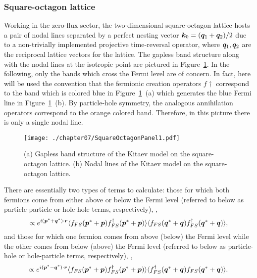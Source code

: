 %
%
\subsubsection{Square-octagon lattice}
\label{section:chapter07_BondBondSquareOctagon}
%
%
Working in the zero-flux sector, the two-dimensional square-octagon lattice hosts a pair of nodal lines separated by a perfect nesting vector $\bm{k}_0 = (\bm{q}_1 + \bm{q}_2)/2$ due to a non-trivially implemented projective time-reversal operator, where $\bm{q}_1, \bm{q}_2$ are the reciprocal lattice vectors for the lattice.
The gapless band structure along with the nodal lines at the isotropic point are pictured in Figure~\ref{fig:chapter07_SquareOctagonPanel1}.
In the following, only the bands which cross the Fermi level are of concern.
In fact, here will be used the convention that the fermionic creation operators $f\dag$ correspond to the band which is colored blue in Figure~\ref{fig:chapter07_SquareOctagonPanel1}~(a) which generates the blue Fermi line in Figure~\ref{fig:chapter07_SquareOctagonPanel1}~(b).
By particle-hole symmetry, the analogous annihilation operators correspond to the orange colored band.
Therefore, in this picture there is only a single nodal line.
%
\begin{figure}[tb]
	\centering
	\texttt{[image: ./chapter07/SquareOctagonPanel1.pdf]}
	\caption{
		(a) Gapless band structure of the Kitaev model on the square-octagon lattice.
		(b) Nodal lines of the Kitaev model on the square-octagon lattice.
	}
	\label{fig:chapter07_SquareOctagonPanel1}
\end{figure}
%

There are essentially two types of terms to calculate: those for which both fermions come from either above or below the Fermi level (referred to below as particle-particle or hole-hole terms, respectively), \ie,
%
\begin{equation}
	\propto e^{i (\bm{p}^* + \bm{q}^*) \cdot \bm{r}} \langle f_{FS}(\bm{p}^* + \bm{p}) f^{\dagger}_{FS}(\bm{p}^* + \bm{p}) \rangle \langle f_{FS}(\bm{q}^* + \bm{q}) f^{\dagger}_{FS}(\bm{q}^* + \bm{q}) \rangle,
\end{equation}
%
and those for which one fermion comes from above (below) the Fermi level while the other comes from below (above) the Fermi level (referred to below as particle-hole or hole-particle terms, respectively), \ie,
%
\begin{equation}
	\propto e^{i (\bm{p}^* - \bm{q}^*) \cdot \bm{r}} \langle f_{FS}(\bm{p}^* + \bm{p}) f^{\dagger}_{FS}(\bm{p}^* + \bm{p}) \rangle \langle f^{\dagger}_{FS}(\bm{q}^* + \bm{q}) f_{FS}(\bm{q}^* + \bm{q}) \rangle.
\end{equation}
%

